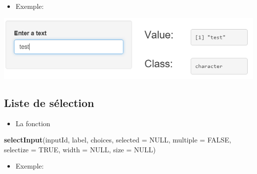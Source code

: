 \documentclass[]{article}
\newenvironment{Shaded}{\begin{snugshade}}{\end{snugshade}}
\newcommand{\KeywordTok}[1]{\textcolor[rgb]{0.13,0.29,0.53}{\textbf{#1}}}
\newcommand{\DataTypeTok}[1]{\textcolor[rgb]{0.13,0.29,0.53}{#1}}
\newcommand{\StringTok}[1]{\textcolor[rgb]{0.31,0.60,0.02}{#1}}
\newcommand{\CommentTok}[1]{\textcolor[rgb]{0.56,0.35,0.01}{\textit{#1}}}
\newcommand{\OtherTok}[1]{\textcolor[rgb]{0.56,0.35,0.01}{#1}}
\newcommand{\NormalTok}[1]{#1}
\providecommand{\tightlist}{%
  \setlength{\itemsep}{0pt}\setlength{\parskip}{0pt}}
\begin{document}
\begin{itemize}
\tightlist
\item
  Exemple:
\end{itemize}

\begin{Shaded}
\end{Shaded}

\includegraphics{img/text.png}

\subsection{Liste de sélection}\label{liste-de-selection}

\begin{itemize}
\tightlist
\item
  La fonction
\end{itemize}

\begin{Shaded}
\begin{Highlighting}[]
\KeywordTok{selectInput}\NormalTok{(inputId, label, choices, }\DataTypeTok{selected =} \OtherTok{NULL}\NormalTok{, }\DataTypeTok{multiple =} \OtherTok{FALSE}\NormalTok{,}
            \DataTypeTok{selectize =} \OtherTok{TRUE}\NormalTok{, }\DataTypeTok{width =} \OtherTok{NULL}\NormalTok{, }\DataTypeTok{size =} \OtherTok{NULL}\NormalTok{)}
\end{Highlighting}
\end{Shaded}

\begin{itemize}
\tightlist
\item
  Exemple:
\end{itemize}
\end{document}
